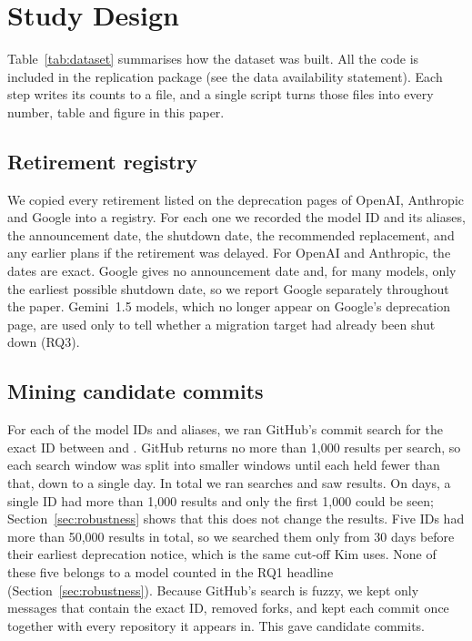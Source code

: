 \section{Study Design}\label{sec:method}

Table~\ref{tab:dataset} summarises how the dataset was built. All the code is included in the replication package (see the data availability statement). Each step writes its counts to a file, and a single script turns those files into every number, table and figure in this paper.

\subsection{Retirement registry}

We copied every retirement listed on the deprecation pages of OpenAI, Anthropic and Google into a registry. For each one we recorded the model ID and its aliases, the announcement date, the shutdown date, the recommended replacement, and any earlier plans if the retirement was delayed. For OpenAI and Anthropic, the dates are exact. Google gives no announcement date and, for many models, only the earliest possible shutdown date, so we report Google separately throughout the paper. Gemini~1.5 models, which no longer appear on Google's deprecation page, are used only to tell whether a migration target had already been shut down (RQ3).

\subsection{Mining candidate commits}

For each of the \ModelIds{} model IDs and aliases, we ran GitHub's commit search for the exact ID between \MiningStart{} and \MiningEnd. GitHub returns no more than 1,000 results per search, so each search window was split into smaller windows until each held fewer than that, down to a single day. In total we ran \Searches{} searches and saw \ResultsSeen{} results. On \TruncatedWindows{} days, a single ID had more than 1,000 results and only the first 1,000 could be seen; Section~\ref{sec:robustness} shows that this does not change the results. Five IDs had more than 50,000 results in total, so we searched them only from 30 days before their earliest deprecation notice, which is the same cut-off Kim uses. None of these five belongs to a model counted in the RQ1 headline (Section~\ref{sec:robustness}). Because GitHub's search is fuzzy, we kept only messages that contain the exact ID, removed forks, and kept each commit once together with every repository it appears in. This gave \Candidates{} candidate commits.

